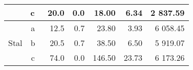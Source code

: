 \begin{table}[H]
{\begin{tabular}{|c|c|r|r|r|r|r|}
                                                                                                     & c~       & 20.0                                                                               & 0.0                                                                                   & 18.00                                                                             & 6.34                                                                                        & 2 837.59                                                                      \\ \hline
    \multirow{3}{*}{Stal}                                                                            & a~       & 12.5                                                                               & 0.7                                                                                   & 23.80                                                                             & 3.93                                                                                        & 6 058.45                                                                      \\ \cline{2-7} 
                                                                                                     & b~       & 20.5                                                                               & 0.7                                                                                   & 38.50                                                                             & 6.50                                                                                        & 5 919.07                                                                      \\ \cline{2-7} 
                                                                                                     & c~       & 74.0                                                                               & 0.0                                                                                   & 146.50                                                                            & 23.73                                                                                       & 6 173.26                                                                      \\ \hline
    \end{tabular}%
    }
    \end{table}